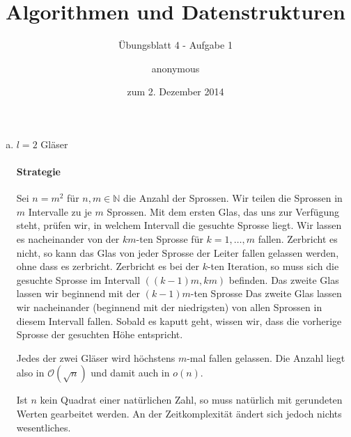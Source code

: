 \documentclass[a4paper]{scrartcl}
\title{Algorithmen und Datenstrukturen}
\subtitle{Übungsblatt 4 - Aufgabe 1}
\author{
    anonymous
}
\date{zum 2. Dezember 2014}
\begin{document}
\maketitle

\begin{enumerate}[(a)]
    \item $l=2$ Gläser
        \paragraph{Strategie}
        Sei $n = m^2$ für $n, m \in \mathbb{N}$ die Anzahl der Sprossen.
        Wir teilen die Sprossen in $m$ Intervalle zu je $m$ Sprossen.
        Mit dem ersten Glas, das uns zur Verfügung steht, prüfen wir, in
        welchem Intervall die gesuchte Sprosse liegt.
        Wir lassen es nacheinander von der $km$-ten Sprosse für
        $k = 1, \ldots, m$ fallen.
        Zerbricht es nicht, so kann das Glas von jeder Sprosse der Leiter
        fallen gelassen werden, ohne dass es zerbricht.
        Zerbricht es bei der $k$-ten Iteration, so muss sich die gesuchte
        Sprosse im Intervall $\left( (k-1)m, km \right)$ befinden.
        Das zweite Glas lassen wir beginnend mit der $(k-1)m$-ten Sprosse
        Das zweite Glas lassen wir nacheinander (beginnend mit der niedrigsten)
        von allen Sprossen in diesem Intervall fallen.
        Sobald es kaputt geht, wissen wir, dass die vorherige Sprosse der
        gesuchten Höhe entspricht.

        Jedes der zwei Gläser wird höchstens $m$-mal fallen gelassen.
        Die Anzahl liegt also in $\mathcal{O}(\sqrt{n})$ und damit auch in
        $o(n)$.

        Ist $n$ kein Quadrat einer natürlichen Zahl, so muss natürlich mit
        gerundeten Werten gearbeitet werden.
        An der Zeitkomplexität ändert sich jedoch nichts wesentliches.





\end{enumerate}
\end{document}
